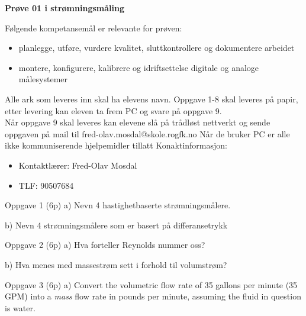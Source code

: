 
\begin{centering}
\Huge{\textbf{Prøve 01 i strømningsmåling}}\\
\end{centering}
\vskip 2cm 
Følgende kompetansemål er relevante for prøven:
\begin{itemize}[noitemsep]

	\item planlegge, utføre, vurdere kvalitet, sluttkontrollere og dokumentere arbeidet
	\item montere, konfigurere, kalibrere og idriftsettelse digitale og analoge målesystemer
\end{itemize}

Alle ark som leveres inn skal ha elevens navn.
\vskip 2.5pt 
Oppgave 1-8 skal leveres på papir, etter levering kan eleven ta frem PC og svare på oppgave 9.\\
\vskip 2.5pt 
Når oppgave 9 skal leveres kan elevene slå på trådløst nettverkt og sende oppgaven på mail til fred-olav.mosdal@skole.rogfk.no
\vskip 2.5pt 
Når de bruker PC er alle ikke kommuniserende hjelpemidler tillatt
\vskip 2.5pt
Konaktinformasjon:
\begin{itemize}[noitemsep]
	\item Kontaktlærer: Fred-Olav Mosdal
	\item TLF: 90507684
\end{itemize}


\vfil \eject
Oppgave 1 (6p)%
\vskip 2.5pt 
a) Nevn 4 hastighetbaserte strømningsmålere. \\
\vskip 2.5pt 
\vskip 2.5pt 
b) Nevn 4 strømningsmålere som er basert på differansetrykk\\
\vskip 2.5pt 
\vskip 2.5pt 


Oppgave 2 (6p) %
\vskip 2.5pt 
a) Hva forteller Reynolds nummer oss? \\
\vskip 2.5pt 
\vskip 2.5pt 

b) Hva menes med massestrøm sett i forhold til volumstrøm? \\
\vskip 2.5pt 
\vskip 2.5pt 
\vskip 2.5pt 
\vfil\eject
Oppgave 3 (6p)%
\vskip 2.5pt 
a) Convert the volumetric flow rate of 35 gallons per minute (35 GPM) into a {\it mass} flow rate in pounds per minute, assuming the fluid in question is water.\\

